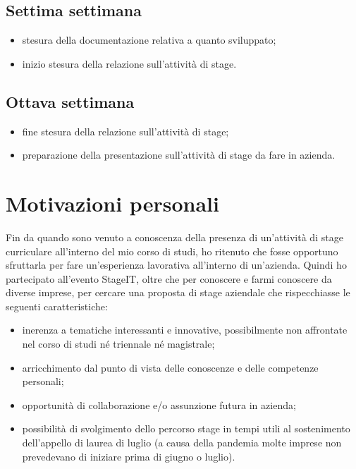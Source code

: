 \subsection*{Settima settimana} 
\begin{itemize}
	\item stesura della documentazione relativa a quanto sviluppato;
	\item inizio stesura della relazione sull'attività di stage.
\end{itemize}

\subsection*{Ottava settimana} 
\begin{itemize}
	\item fine stesura della relazione sull'attività di stage;
	\item preparazione della presentazione sull'attività di stage da fare in azienda.
\end{itemize}

\section{Motivazioni personali}

Fin da quando sono venuto a conoscenza della presenza di un'attività di stage curriculare all'interno del mio corso di studi, ho ritenuto che fosse opportuno sfruttarla per fare un'esperienza lavorativa all'interno di un'azienda. Quindi ho partecipato all'evento StageIT, oltre che per conoscere e farmi conoscere da diverse imprese, per cercare una proposta di stage aziendale che rispecchiasse le seguenti caratteristiche:

\begin{itemize}
	\item inerenza a tematiche interessanti e innovative, possibilmente non affrontate nel corso di studi né triennale né magistrale;
	\item arricchimento dal punto di vista delle conoscenze e delle competenze personali;
	\item opportunità di collaborazione e/o assunzione futura in azienda;
	\item possibilità di svolgimento dello percorso stage in tempi utili al sostenimento dell'appello di laurea di luglio (a causa della pandemia molte imprese non prevedevano di iniziare prima di giugno o luglio).
\end{itemize}

